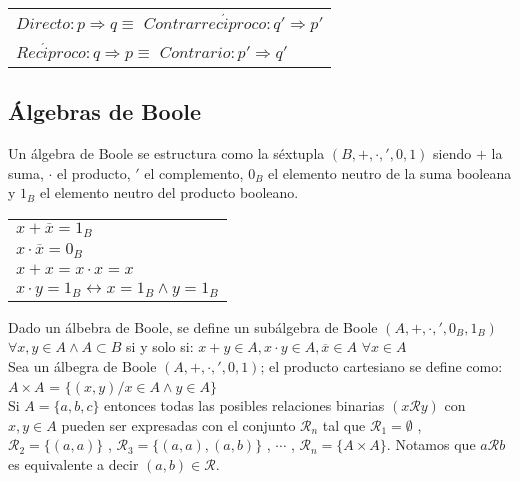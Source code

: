 \documentclass[titlepage,a4paper,12pt,twoside]{article}
\begin{document}
\begin{table}[htbp]
\centering
\begin{tabular}{l}
 $Directo: p \Rightarrow q \equiv $ $  Contrarrec\acute{i}proco: q' \Rightarrow p'$\\
 $Rec\acute{i}proco:  q \Rightarrow p \equiv $ $  Contrario: p' \Rightarrow q'$\\
\end{tabular}
\label{tabla}
\end{table}

\subsection{Álgebras de Boole}

Un álgebra de Boole se estructura como la séxtupla $(B, +, \cdot , ', 0, 1)$ siendo $+$ la suma, $\cdot$ el producto, $'$ el complemento, $0_{B}$ el elemento neutro de la suma booleana y $1_{B}$ el elemento neutro del producto booleano.

\begin{table}[htbp]
\centering
\begin{tabular}{l}
 $x+\overline{x} = 1_{B}$\\
 $x \cdot \overline{x} = 0_{B}$\\
 $x+x = x \cdot x = x$\\
 $x \cdot y = 1_{B} \leftrightarrow x = 1_{B} \wedge y = 1_{B}$\\
\end{tabular}
\label{tabla}
\end{table}

Dado un álbebra de Boole, se define un subálgebra de Boole $(A, +, \cdot , ', 0_{B}, 1_{B}) $ $\forall x,y \in A \wedge A \subset B$ si y solo si: $x+y \in A, x \cdot y \in A, \overline{x} \in A $ $\forall x \in A$\\

Sea un álbegra de Boole $(A, +, \cdot , ', 0, 1) $; el producto cartesiano se define como: $A \times A$  = $\{(x,y)/x \in A \wedge y \in A\}$\\

Si $A = \{a,b,c\}$ entonces todas las posibles relaciones binarias $(x \mathcal{R} y)$ con $x,y \in A$ pueden ser expresadas con el conjunto $\mathcal{R}_{n}$ tal que $\mathcal{R}_{1} = \emptyset $ , $\mathcal{R}_{2} = \{(a,a)\} $ , $\mathcal{R}_{3} = \{(a,a),(a,b)\} $ , $\cdots$ , $\mathcal{R}_{n} = \{A \times A\} $. Notamos que $a \mathcal{R} b$ es equivalente a decir $(a,b) \in \mathcal{R}.$\\
\end{document}
